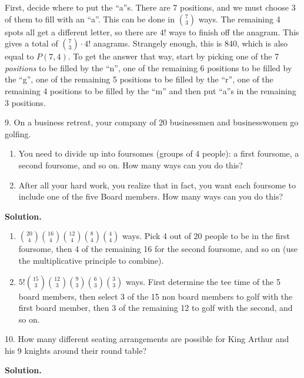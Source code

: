 \documentclass[10pt,]{book}
\theoremstyle{plain}
\theoremstyle{definition}
\theoremstyle{definition}
\theoremstyle{definition}
\numberwithin{equation}{section}
\begin{document}
\begin{exerciselist}
                First, decide where to put the ``a''s. There are 7 positions, and we must choose 3 of them to fill with an ``a''. This can be done in \({7 \choose 3}\) ways. The remaining 4 spots all get a different letter, so there are \(4!\) ways to finish off the anagram. This gives a total of \({7 \choose 3}\cdot 4!\) anagrams. Strangely enough, this is 840, which is also equal to \(P(7,4)\). To get the answer that way, start by picking one of the 7 \emph{positions} to be filled by the ``n'', one of the remaining 6 positions to be filled by the ``g'', one of the remaining 5 positions to be filled by the ``r'', one of the remaining 4 positions to be filled by the ``m'' and then put ``a''s in the remaining 3 positions.
\item[9.]\hypertarget{exercise-68}{}
                On a business retreat, your company of 20 businessmen and businesswomen go golfing.
\leavevmode%
\begin{enumerate}[label=(\alph*)]
\item\hypertarget{li-490}{}
You need to divide up into foursomes (groups of 4 people): a first foursome, a second foursome, and so on.  How many ways can you do this?
%
\item\hypertarget{li-491}{}
After all your hard work, you realize that in fact, you want each foursome to include one of the five Board members.  How many ways can you do this?
%
\end{enumerate}
\par\smallskip
\par\smallskip
\noindent\textbf{Solution.}\hypertarget{solution-99}{}\quad
\leavevmode%
\begin{enumerate}[label=(\alph*)]
\item\hypertarget{li-492}{}\({20 \choose 4}{16 \choose 4}{12 \choose 4}{8 \choose 4}{4 \choose 4}\) ways. Pick 4 out of 20 people to be in the first foursome, then 4 of the remaining 16 for the second foursome, and so on (use the multiplicative principle to combine).%
\item\hypertarget{li-493}{}\(5!{15 \choose 3}{12 \choose 3}{9 \choose 3}{6 \choose 3}{3 \choose 3}\) ways.  First determine the tee time of the 5 board members, then select 3 of the 15 non board members to golf with the first board member, then 3 of the remaining 12 to golf with the second, and so on.%
\end{enumerate}
\item[10.]\hypertarget{exercise-69}{}
                How many different seating arrangements are possible for King Arthur and his 9 knights around their round table?
\par\smallskip
\par\smallskip
\noindent\textbf{Solution.}\hypertarget{solution-100}{}\quad


\end{exerciselist}
\end{document}
